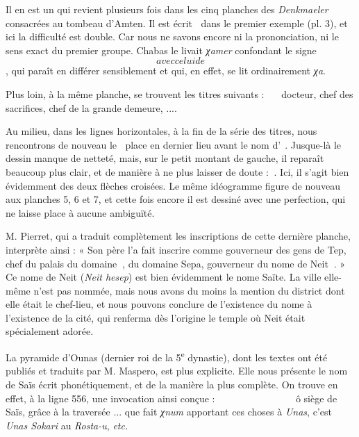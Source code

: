 \documentclass[a4paper, 11pt, oneside]{article}
\newcommand*\hieroAAAH{}
\newcommand*\hieroAAAI{}
\newcommand*\hieroAAAW{\raisebox{0.5ex}{}}
\newcommand*\hieroAABG{}
\newcommand*\hieroAABH{}
\newcommand*\hieroAABI{}
\newcommand*\hieroAABJ{}
\newcommand*\hieroAABK{}
\newcommand*\hieroAABL{}
\newcommand*\hieroAABM{}
\newcommand*\hieroAABN{}
\newcommand*\hieroAABO{}
\newcommand*\hieroAABP{}
\newcommand*\hieroAABQ{}
\newcommand*\hieroAABR{}
\newcommand*\hieroAABS{}
\newcommand*\hieroAABT{}
\newcommand*\hieroAABU{}
\newcommand*\hieroAABV{}
\newcommand*\hieroAABW{}
\newcommand*\hieroAABX{}
\newcommand*\hieroAABY{\raisebox{0.5ex}{}}
\newcommand*\hieroAABZ{}
\newcommand*\hieroAACA{}
\newcommand*\hieroAACB{\raisebox{0.5ex}{}}
\newcommand*\hieroAACC{}
\newcommand*\hieroAACD{}
\newcommand*\hieroAACE{}
\newcommand*\hieroAACF{}
\newcommand*\hieroAACG{}
\newcommand*\hieroAACH{}
\newcommand*\hieroAACI{}
\newcommand*\hieroAACJ{}
\newcommand*\hieroAACK{}
\newcommand*\hieroAACL{\raisebox{0.5ex}{}}
\newcommand*\hieroAACM{}
\newcommand*\hieroAACN{\raisebox{1ex}{}}
\newcommand*\hieroAACO{}
\newcommand*\hieroAACP{}
\newcommand*\hieroAACQ{}
\newcommand*\hieroAACR{}
\newcommand*\hieroAACS{}
\newcommand*\hieroAACT{}
\newcommand*\hieroAACU{}
\begin{document}
Il en est un qui revient plusieurs fois dans les cinq planches des \emph{Denkmaeler} consacrées au tombeau d'Amten. Il est écrit $\hieroAABG\:\hieroAABH$ dans le premier exemple (pl. 3), et ici la difficulté est double. Car nous ne savons encore ni la prononciation, ni le sens exact du premier groupe. Chabas le livait \emph{χamer} confondant le signe $\hieroAABI$ avec celui de $\hieroAABJ$, qui paraît en différer sensiblement et qui, en effet, se lit ordinairement \emph{χa}.

Plus loin, à la même planche, se trouvent les titres suivants : $\hieroAABK\:\hieroAABL\:\hieroAABM\:\hieroAABN\:\hieroAABO\:\hieroAABP$ docteur, chef des sacrifices, chef de la grande demeure, ....

Au milieu, dans les lignes horizontales, à la fin de la série des titres, nous rencontrons de nouveau le $\hieroAABG\:\hieroAABP$ place en dernier lieu avant le nom d'$\hieroAABQ\:\hieroAABR\:\hieroAABS$. Jusque-là le dessin manque de netteté, mais, sur le petit montant de gauche, il reparaît beaucoup plus clair, et de manière à ne plus laisser de doute : $\hieroAABG\:\hieroAABT$. Ici, il s'agit bien évidemment des deux flèches croisées. Le même idéogramme figure de nouveau aux planches 5, 6 et 7, et cette fois encore il est dessiné avec une perfection, qui ne laisse place à aucune ambiguïté.

M. Pierret, qui a traduit complètement les inscriptions de cette dernière planche, interprète ainsi : « Son père l'a fait inscrire comme gouverneur des gens de Tep, chef du palais du domaine $\hieroAABU\:\hieroAABV$, du domaine Sepa, gouverneur du nome de Neit $\hieroAABG\:\hieroAABW$. » Ce nome de Neit (\emph{Neit hesep}) est bien évidemment le nome Saïte. La ville elle-même n'est pas nommée, mais nous avons du moins la mention du district dont elle était le chef-lieu, et nous pouvons conclure de l'existence du nome à l'existence de la cité, qui renferma dès l'origine le temple où Neit était spécialement adorée.

La pyramide d'Ounas (dernier roi de la 5\textsuperscript{e} dynastie), dont les textes ont été publiés et traduits par M. Maspero, est plus explicite. Elle nous présente le nom de Saïs écrit phonétiquement, et de la manière la plus complète. On trouve en effet, à la ligne 556, une invocation ainsi conçue : $\hieroAABX\:\hieroAABY\:\hieroAABZ\:\hieroAAAI\allowbreak\:\hieroAACA\:\hieroAACB\:\hieroAAAW\:\hieroAABR\:\hieroAACC\allowbreak\:\hieroAACD\:\hieroAAAH\:\hieroAACE\:\hieroAAAH\allowbreak\:\hieroAAAH\:\hieroAACF\:\hieroAACB\:\hieroAACG\allowbreak\:\hieroAACH\:\hieroAACI\:\hieroAAAH\:\hieroAACJ\allowbreak\:\hieroAACK\:\hieroAACL\:\hieroAACM\:\hieroAACN\:\hieroAACO\allowbreak\:\hieroAACO\:\hieroAACP\:\hieroAACQ\:\hieroAACN\allowbreak\:\hieroAAAH\:\hieroAACR\:\hieroAACS\:\hieroAACT\:\hieroAACU$ ô siège de Saïs, grâce à la traversée ... que fait \emph{χnum} apportant ces choses à \emph{Unas}, c'est \emph{Unas Sokari} au \emph{Rosta-u}, \emph{etc.}
\end{document}
